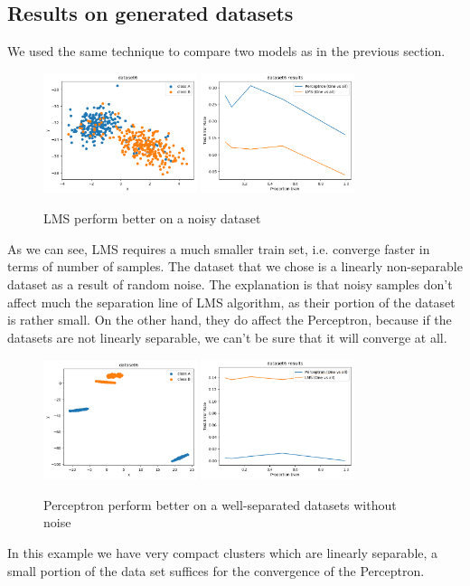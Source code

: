\documentclass[12pt]{article}
\begin{document}
\subsection{Results on generated datasets}
We used the same technique to compare two models as in the previous section. 
\begin{figure}[ht]
	\centering
	\includegraphics[width=0.4\textwidth]{weirdo_hoff_plots/dataset_lms}
	\includegraphics[width=0.4\textwidth]{weirdo_hoff_plots/plot_lms}
	\caption{LMS perform better on a noisy dataset}
\end{figure}
As we can see, LMS requires a much smaller train set, i.e. converge faster in terms of number of samples. The dataset that we chose is a linearly non-separable dataset as a result of random noise. The explanation is that noisy samples don't affect much the separation line of LMS algorithm, as their portion of the dataset is rather small. On the other hand, they do affect the Perceptron, because if the datasets are not linearly separable, we can't be sure that it will converge at all. 

\begin{figure}[ht]
	\centering
	\includegraphics[width=0.4\textwidth]{weirdo_hoff_plots/dataset_perc}
	\includegraphics[width=0.4\textwidth]{weirdo_hoff_plots/plot_perc}
	\caption{Perceptron perform better on a well-separated datasets without noise}			
\end{figure}
In this example we have very compact clusters which are linearly separable, a small portion of the data set suffices for the convergence of the Perceptron.
\end{document}
